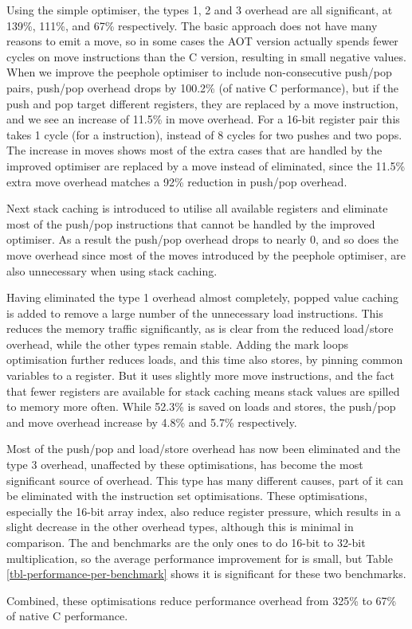Using the simple optimiser, the types 1, 2 and 3 overhead are all significant, at 139\%,  111\%, and 67\% respectively. The basic approach does not have many reasons to emit a move, so in some cases the AOT version actually spends fewer cycles on move instructions than the C version, resulting in small negative values.  When we improve the peephole optimiser to include non-consecutive push/pop pairs, push/pop overhead drops by 100.2\% (of native C performance), but if the push and pop target different registers, they are replaced by a move instruction, and we see an increase of 11.5\% in move overhead. For a 16-bit register pair this takes 1 cycle (for a  instruction), instead of 8 cycles for two pushes and two pops. The increase in moves shows most of the extra cases that are handled by the improved optimiser are replaced by a move instead of eliminated, since the 11.5\% extra move overhead matches a 92\% reduction in push/pop overhead.

Next stack caching is introduced to utilise all available registers and eliminate most of the push/pop instructions that cannot be handled by the improved optimiser. As a result the push/pop overhead drops to nearly 0, and so does the move overhead since most of the moves introduced by the peephole optimiser, are also unnecessary when using stack caching.

Having eliminated the type 1 overhead almost completely, popped value caching is added to remove a large number of the unnecessary load instructions. This reduces the memory traffic significantly, as is clear from the reduced load/store overhead, while the other types remain stable. Adding the mark loops optimisation further reduces loads, and this time also stores, by pinning common variables to a register. But it uses slightly more move instructions, and the fact that fewer registers are available for stack caching means stack values are spilled to memory more often. While 52.3\% is saved on loads and stores, the push/pop and move overhead increase by 4.8\% and 5.7\% respectively.

Most of the push/pop and load/store overhead has now been eliminated and the type 3 overhead, unaffected by these optimisations, has become the most significant source of overhead. This type has many different causes, part of it can be eliminated with the instruction set optimisations. These optimisations, especially the 16-bit array index, also reduce register pressure, which results in a slight decrease in the other overhead types, although this is minimal in comparison. The  and  benchmarks are the only ones to do 16-bit to 32-bit multiplication, so the average performance improvement for  is small, but Table \ref{tbl-performance-per-benchmark} shows it is significant for these two benchmarks.

Combined, these optimisations reduce performance overhead from 325\% to 67\% of native C performance.
